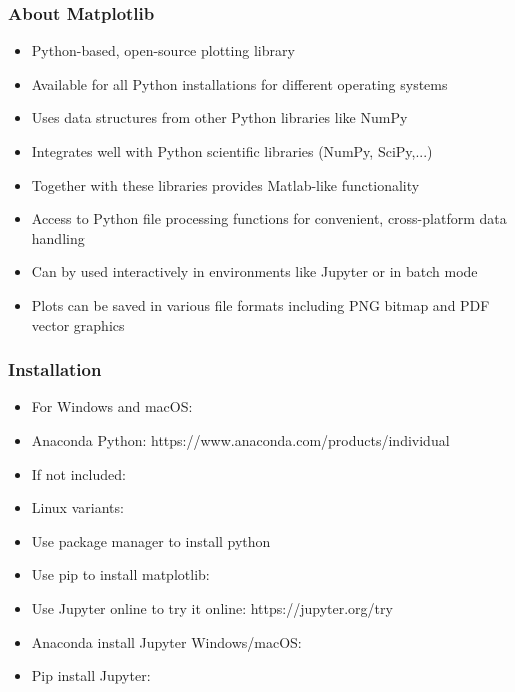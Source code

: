 
\begin{frame}
	\frametitle{About Matplotlib}

    \begin{itemize}
    \item Python-based, open-source plotting library
    \item Available for all Python installations for different operating systems
    \item Uses data structures from other Python libraries like NumPy
    \item Integrates well with Python scientific libraries (NumPy, SciPy,...)
    \item Together with these libraries provides Matlab-like functionality 
    \item Access to Python file processing functions for convenient, cross-platform data handling 
    \item Can by used interactively in environments like Jupyter or in batch mode
    \item Plots can be saved in various file formats including PNG bitmap and PDF vector graphics
    \end{itemize}

\end{frame}

\begin{frame}
	\frametitle{Installation}
    \begin{itemize}
      \item For Windows and macOS:		
      \item Anaconda Python: https://www.anaconda.com/products/individual
			\item If not included:       
      \item Linux variants:
      \item Use package manager to install python
			\item Use pip to install matplotlib: 
			\item Use Jupyter online to try it online: https://jupyter.org/try
			\item Anaconda install Jupyter Windows/macOS: 
			\item Pip install Jupyter: 
    \end{itemize}
\end{frame}

